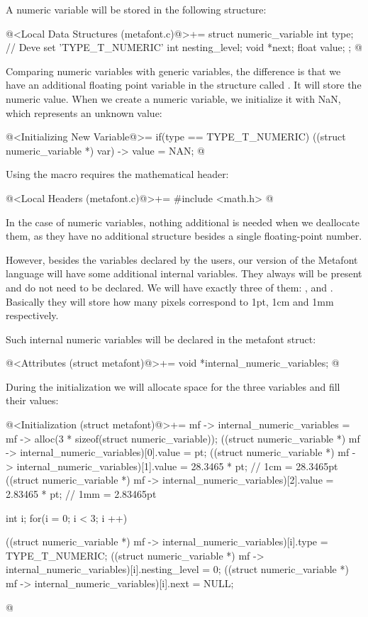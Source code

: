 
A numeric variable will be stored in the following structure:

\iniciocodigo
@<Local Data Structures (metafont.c)@>+=
struct numeric_variable{
  int type; // Deve set 'TYPE_T_NUMERIC'
  int nesting_level;
  void *next;
  float value;
};
@
\fimcodigo

Comparing numeric variables with generic variables, the difference is
that we have an additional floating point variable in the structure
called . It will store the numeric value. When we
create a numeric variable, we initialize it with NaN, which represents
an unknown value:

\iniciocodigo
@<Initializing New Variable@>=
if(type == TYPE_T_NUMERIC){
  ((struct numeric_variable *) var) -> value = NAN;
}
@
\fimcodigo

Using the macro  requires the mathematical header:

\iniciocodigo
@<Local Headers (metafont.c)@>+=
#include <math.h>
@
\fimcodigo

In the case of numeric variables, nothing additional is needed when we
deallocate them, as they have no additional structure besides a single
floating-point number.

However, besides the variables declared by the users, our version of
the Metafont language will have some additional internal
variables. They always will be present and do not need to be
declared. We will have exactly three of
them: ,  and . Basically
they will store how many pixels correspond to 1pt, 1cm and 1mm
respectively.

Such internal numeric variables will be declared in the metafont
struct:

\iniciocodigo
@<Attributes (struct metafont)@>+=
void *internal_numeric_variables;
@
\fimcodigo

During the initialization we will allocate space for the three
variables and fill their values:

\iniciocodigo
@<Initialization (struct metafont)@>+=
mf -> internal_numeric_variables =
             mf -> alloc(3 * sizeof(struct numeric_variable));
((struct numeric_variable *) mf -> internal_numeric_variables)[0].value =
   pt;
((struct numeric_variable *) mf -> internal_numeric_variables)[1].value =
   28.3465 * pt; // 1cm = 28.3465pt
((struct numeric_variable *) mf -> internal_numeric_variables)[2].value =
   2.83465 * pt; // 1mm = 2.83465pt
{
  int i;
  for(i = 0; i < 3; i ++){
    ((struct numeric_variable *)
      mf -> internal_numeric_variables)[i].type = TYPE_T_NUMERIC;
    ((struct numeric_variable *)
      mf -> internal_numeric_variables)[i].nesting_level = 0;
    ((struct numeric_variable *)
      mf -> internal_numeric_variables)[i].next = NULL;    

  }
}
@
\fimcodigo

